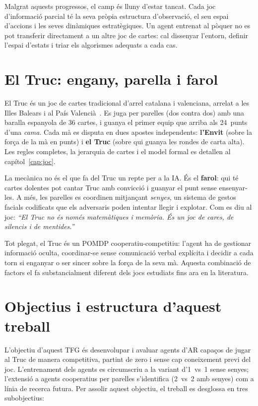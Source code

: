 Malgrat aquests progressos, el camp és lluny d'estar tancat. Cada joc d'informació
parcial té la seva pròpia estructura d'observació, el seu espai d'accions i les seves
dinàmiques estratègiques. Un agent entrenat al pòquer no es pot transferir directament
a un altre joc de cartes: cal dissenyar l'entorn, definir l'espai d'estats i triar els
algorismes adequats a cada cas.

\section{El Truc: engany, parella i farol}

El Truc és un joc de cartes tradicional d'arrel catalana i valenciana, arrelat a les
Illes Balears i al País Valencià~\cite{retruc}. Es juga per parelles (dos contra dos)
amb una baralla espanyola de 36 cartes, i guanya el primer equip que arriba als
24~punts d'una \emph{cama}. Cada mà es disputa en dues apostes independents:
\textbf{l'Envit} (sobre la força de la mà en punts) i \textbf{el Truc} (sobre qui
guanya les rondes de carta alta). Les regles completes, la jerarquia de cartes i
el model formal es detallen al capítol~\ref{cap:joc}.

La mecànica no és el que fa del Truc un repte per a la \ac{IA}. És el \textbf{farol}:
qui té cartes dolentes pot cantar Truc amb convicció i guanyar el punt sense
ensenyar-les. A més, les parelles es coordinen mitjançant \emph{senyes}, un sistema
de gestos facials codificats que els adversaris poden intentar llegir i explotar.
Com es diu al joc: \emph{``El Truc no és només matemàtiques i memòria. És un joc
de cares, de silencis i de mentides.''}

Tot plegat, el Truc és un \ac{POMDP} cooperatiu-competitiu: l'agent ha de gestionar
informació oculta, coordinar-se sense comunicació verbal explícita i decidir a cada
torn si enganyar o ser sincer sobre la força de la seva mà. Aquesta combinació de
factors el fa substancialment diferent dels jocs estudiats fins ara en la literatura.

\section{Objectius i estructura d'aquest treball}

L'objectiu d'aquest \ac{TFG} és desenvolupar i avaluar agents d'\ac{AR} capaços de jugar al Truc de
manera competitiva, partint de zero i sense cap coneixement previ del joc. L'entrenament dels agents es circumscriu
a la variant d'1~vs~1 sense senyes; l'extensió a agents cooperatius  per
parelles s'identifica (2~vs~2 amb senyes) com a línia de recerca futura. Per assolir aquest objectiu, el treball es desglossa en tres subobjectius:

